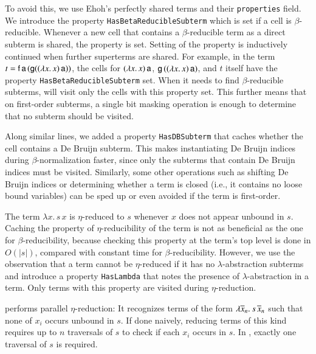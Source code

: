 To avoid this, we use Ehoh's perfectly shared
terms and their \texttt{properties} field.
%
We introduce the property \texttt{HasBetaReducibleSubterm} which is set if
a cell is $\beta$-reducible.
Whenever a new cell that contains a
$\beta$-reducible term as a direct subterm is shared, the property is set.
Setting of the property is inductively continued when further superterms are
shared. For example, in the term $t = \mathsf{f} \, \mathsf{a} \, (\mathsf{g} ((\lambda x.\,
x)\,\mathsf{a}))$, the cells for $(\lambda x.\, x)\,\mathsf{a}$,
$\mathsf{g}\,((\lambda x.\, x)\,\mathsf{a})$, and $t$ itself have the property
\texttt{HasBetaReducibleSubterm} set.
%
When it needs to find $\beta$-reducible subterms, \ehohii{} will visit only the
cells with this property set. This further means that on first-order
subterms, a single bit masking operation is enough to determine that no subterm
should be visited.

Along similar lines, we added a property \texttt{HasDBSubterm} that
caches whether the cell contains a De Bruijn subterm. This
makes
instantiating De Bruijn indices during $\beta$-norma\-lization faster, since only the
subterms that contain De Bruijn indices must be visited. Similarly, some other
operations such as shifting De Bruijn indices or determining whether a term is closed
(i.e., it contains no loose bound variables) can be sped up or even avoided
if the term is first-order.

The term $\lambda x.\, s \, x$ is $\eta$-reduced to $s$ whenever $x$ does not appear
unbound in $s$. Caching the property of $\eta$-reducibility of the term is not
as beneficial as the one for $\beta$-reducibility, because checking this
property at the term's top level is done in $O(|s|)$, compared with constant time
for $\beta$-reducibility.
However, we use the observation that a term cannot be $\eta$-reduced if it has
no $\lambda$-abstraction subterms and introduce a property \texttt{HasLambda}
that notes the presence of $\lambda$-abstraction in a term. Only
terms with this property are visited during $\eta$-reduction.

\ehohii{} performs parallel $\eta$-reduction: It recognizes terms of the form
$\lambda \overline{x}_n.\> s \, \overline{x}_n  $ such that none of $x_i$
occurs unbound in $s$. If done naively, reducing terms of this kind requires up to $n$
traversals of $s$ to check if each $x_i$ occurs in $s$. In \ehohii{}, exactly one
traversal of $s$ is required.

